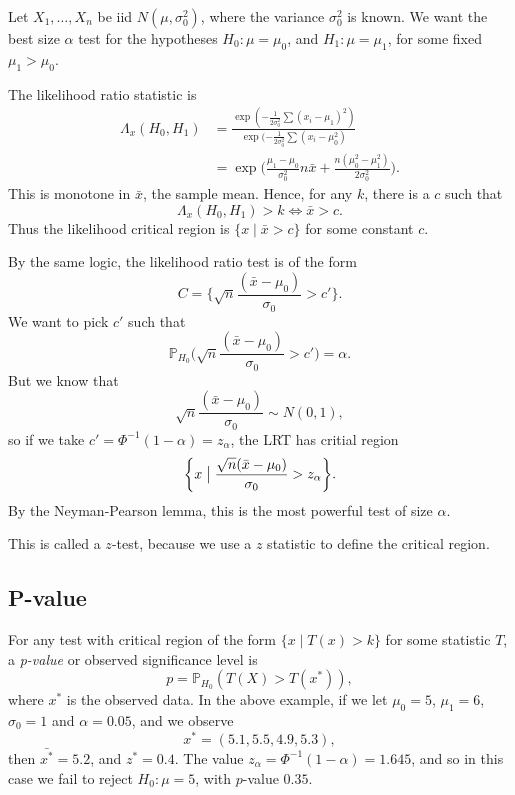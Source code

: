 \documentclass[12pt]{article}
\begin{document}
\begin{exbox}
	Let $X_1, \ldots, X_n$ be iid $N(\mu, \sigma_0^2)$, where the variance $\sigma_0^2$ is known. We want the best size $\alpha$ test for the hypotheses $H_0 : \mu = \mu_0$, and $H_1 : \mu = \mu_1$, for some fixed $\mu_1 > \mu_0$.

	The likelihood ratio statistic is
	\begin{align*}
		\Lambda_x(H_0,H_1) &= \frac{\exp(-\frac{1}{2\sigma_0^2}\sum(x_i - \mu_1)^2)}{\exp(-\frac{1}{2 \sigma_0^2} \sum(x_i - \mu_0^2)} \\
				   &= \exp \biggl( \frac{\mu_1 - \mu_0}{\sigma_0^2} n \bar x + \frac{n(\mu_0^2 - \mu_1^2)}{2 \sigma_0^2} \biggr).
	\end{align*}
	This is monotone in $\bar x$, the sample mean. Hence, for any $k$, there is a $c$ such that
	\[
	\Lambda_x (H_0, H_1) > k \iff \bar x > c
	.\]
	Thus the likelihood critical region is $\{x \mid \bar x > c\}$ for some constant $c$.

	By the same logic, the likelihood ratio test is of the form
	\[
		C = \biggl\{ \sqrt n \frac{(\bar x - \mu_0)}{\sigma_0} > c' \biggr\}
	.\]
	We want to pick $c'$ such that
	\[
	\mathbb{P}_{H_0} \biggl( \sqrt n \frac{(\bar x - \mu_0)}{\sigma_0} > c'\biggr) = \alpha
	.\]
	But we know that
	\[
	\sqrt n \frac{(\bar x - \mu_0)}{\sigma_0} \sim N(0, 1)
	,\]
	so if we take $c' = \Phi^{-1}(1 - \alpha) = z_{\alpha}$, the LRT has critial region
	\[
		\biggl\{ x \bigm| \frac{\sqrt n (\bar x - \mu_0)}{\sigma_0} > z_{\alpha} \biggr\}
	.\]
	By the Neyman-Pearson lemma, this is the most powerful test of size $\alpha$.

	This is called a $z$-test, because we use a $z$ statistic to define the critical region.
\end{exbox}

\subsection{P-value}
\label{sub:p_value}

For any test with critical region of the form $\{x \mid T(x) > k\}$ for some statistic $T$, a \emph{p-value} or observed significance level is
\[
p = \mathbb{P}_{H_0}(T(X) > T(x^{\ast}))
,\]
where $x^{\ast}$ is the observed data. In the above example, if we let $\mu_0 = 5$, $\mu_1 = 6$, $\sigma_0 = 1$ and $\alpha = 0.05$, and we observe
\[
x^{\ast} = (5.1, 5.5, 4.9, 5.3)
,\]
then $\bar{x^{\ast}} = 5.2$, and $z^{\ast} = 0.4$. The value $z_{\alpha} = \Phi^{-1}(1 - \alpha) = 1.645$, and so in this case we fail to reject $H_0 : \mu = 5$, with $p$-value $0.35$.
\end{document}
